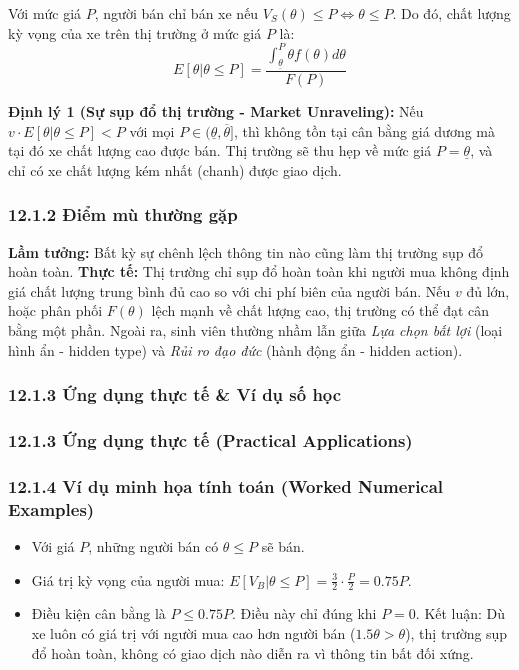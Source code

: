 \documentclass[
]{article}
\providecommand{\tightlist}{%
  \setlength{\itemsep}{0pt}\setlength{\parskip}{0pt}}
\begin{document}
Với mức giá \(P\), người bán chỉ bán xe nếu
\(V_S(\theta) \leq P \iff \theta \leq P\). Do đó, chất lượng kỳ vọng của
xe trên thị trường ở mức giá \(P\) là:
\[ E[\theta | \theta \leq P] = \frac{\int_{\underline{\theta}}^{P} \theta f(\theta) d\theta}{F(P)} \]

\textbf{Định lý 1 (Sự sụp đổ thị trường - Market Unraveling):} Nếu
\(v \cdot E[\theta | \theta \leq P] < P\) với mọi
\(P \in (\underline{\theta}, \overline{\theta}]\), thì không tồn tại cân
bằng giá dương mà tại đó xe chất lượng cao được bán. Thị trường sẽ thu
hẹp về mức giá \(P = \underline{\theta}\), và chỉ có xe chất lượng kém
nhất (chanh) được giao dịch.

\subsubsection{12.1.2 Điểm mù thường
gặp}\label{ux111iux1ec3m-muxf9-thux1b0ux1eddng-gux1eb7p}

\textbf{Lầm tưởng:} Bất kỳ sự chênh lệch thông tin nào cũng làm thị
trường sụp đổ hoàn toàn. \textbf{Thực tế:} Thị trường chỉ sụp đổ hoàn
toàn khi người mua không định giá chất lượng trung bình đủ cao so với
chi phí biên của người bán. Nếu \(v\) đủ lớn, hoặc phân phối
\(F(\theta)\) lệch mạnh về chất lượng cao, thị trường có thể đạt cân
bằng một phần. Ngoài ra, sinh viên thường nhầm lẫn giữa \emph{Lựa chọn
bất lợi} (loại hình ẩn - hidden type) và \emph{Rủi ro đạo đức} (hành
động ẩn - hidden action).

\subsubsection{12.1.3 Ứng dụng thực tế \& Ví dụ số
học}\label{ux1ee9ng-dux1ee5ng-thux1ef1c-tux1ebf-vuxed-dux1ee5-sux1ed1-hux1ecdc}

\subsubsection{12.1.3 Ứng dụng thực tế (Practical
Applications)}\label{ux1ee9ng-dux1ee5ng-thux1ef1c-tux1ebf-practical-applications-40}

\subsubsection{12.1.4 Ví dụ minh họa tính toán (Worked Numerical
Examples)}\label{vuxed-dux1ee5-minh-hux1ecda-tuxednh-touxe1n-worked-numerical-examples-32}

\begin{itemize}
\tightlist
\item
  Với giá \(P\), những người bán có \(\theta \leq P\) sẽ bán.
\item
  Giá trị kỳ vọng của người mua:
  \(E[V_B | \theta \leq P] = \frac{3}{2} \cdot \frac{P}{2} = 0.75P\).
\item
  Điều kiện cân bằng là \(P \leq 0.75P\). Điều này chỉ đúng khi
  \(P = 0\). Kết luận: Dù xe luôn có giá trị với người mua cao hơn người
  bán (\(1.5\theta > \theta\)), thị trường sụp đổ hoàn toàn, không có
  giao dịch nào diễn ra vì thông tin bất đối xứng.
\end{itemize}
\end{document}
